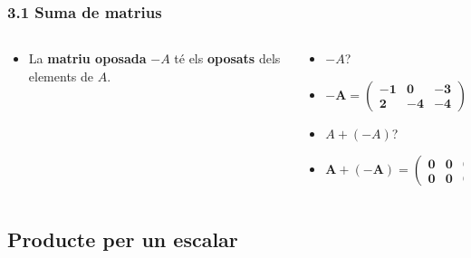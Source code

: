 \documentclass[aspectratio=169]{beamer}
\newcommand{\solucio}[1]{{\color{margueVerdFosc}\ensuremath{\mathbf{#1}}}}
\begin{document}
\begin{frame}[t]
  \frametitle{3.1 Suma de matrius}

  \vspace{-0.28cm}
  \begin{columns}[T,onlytextwidth]
    \begin{column}{0.50\textwidth}
      \begin{itemize}
        \item<1-> La \textbf{matriu oposada} $-A$ té els \textbf{oposats} dels elements de $A$.
      \end{itemize}
    \end{column}

    \begin{column}{0.48\textwidth}
      \begin{itemize}
        \item<3-> $-A$?
        \item<4-> \solucio{-A = \begin{pmatrix} -1 & 0 & -3 \\ 2 & -4 & -4 \end{pmatrix}}
        \item<5-> $A + (-A)$?
        \item<6-> \solucio{A + (-A) = \begin{pmatrix} 0 & 0 & 0 \\ 0 & 0 & 0 \end{pmatrix} = \mathbf{0}}
      \end{itemize}
    \end{column}
  \end{columns}
\end{frame}

\subsection{Producte per un escalar}
\end{document}
